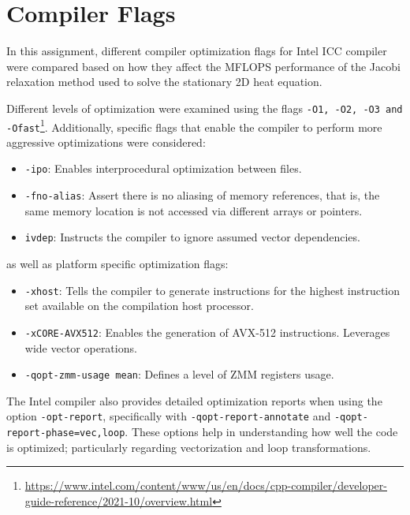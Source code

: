 \chapter{Compiler Flags}

In this assignment, different compiler optimization flags for Intel ICC compiler were compared based on how they affect the MFLOPS performance of the Jacobi relaxation method used to solve the stationary 2D heat equation.

Different levels of optimization were examined using the flags \texttt{-O1, -O2, -O3 and -Ofast}\footnote{
    \url{https://www.intel.com/content/www/us/en/docs/cpp-compiler/developer-guide-reference/2021-10/overview.html}
}.
Additionally, specific flags that enable the compiler to perform more aggressive optimizations were considered:
\begin{itemize}
    \item \texttt{-ipo}: Enables interprocedural optimization between files.
    \item \texttt{-fno-alias}: Assert there is no aliasing of memory references, that is, the same memory location is not accessed via different arrays or pointers.
    \item \texttt{ivdep}: Instructs the compiler to ignore assumed vector dependencies.
\end{itemize}
as well as platform specific optimization flags:
\begin{itemize}
    \item \texttt{-xhost}: Tells the compiler to generate instructions for the highest instruction set available on the compilation host processor.
    \item \texttt{-xCORE-AVX512}: Enables the generation of AVX-512 instructions. Leverages wide vector operations.
    \item \texttt{-qopt-zmm-usage mean}: Defines a level of ZMM registers usage.
\end{itemize}

The Intel compiler also provides detailed optimization reports when using the option \texttt{-opt-report}, specifically with \texttt{-qopt-report-annotate} and \texttt{-qopt-report-phase=vec,loop}. These options help in understanding how well the code is optimized; particularly regarding vectorization and loop transformations.

